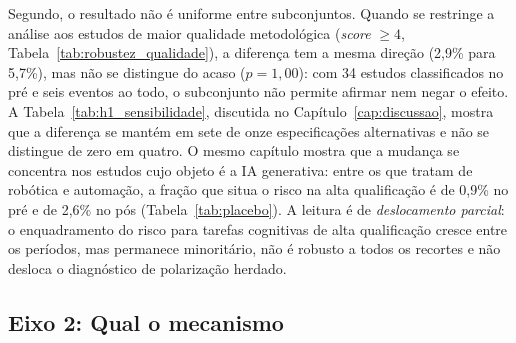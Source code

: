Segundo, o resultado não é uniforme entre subconjuntos. Quando se restringe a análise aos estudos de maior qualidade metodológica (\textit{score} $\geq 4$, Tabela~\ref{tab:robustez_qualidade}), a diferença tem a mesma direção (2,9\% para 5,7\%), mas não se distingue do acaso ($p = 1{,}00$): com 34 estudos classificados no pré e seis eventos ao todo, o subconjunto não permite afirmar nem negar o efeito. A Tabela~\ref{tab:h1_sensibilidade}, discutida no Capítulo~\ref{cap:discussao}, mostra que a diferença se mantém em sete de onze especificações alternativas e não se distingue de zero em quatro. O mesmo capítulo mostra que a mudança se concentra nos estudos cujo objeto é a IA generativa: entre os que tratam de robótica e automação, a fração que situa o risco na alta qualificação é de 0,9\% no pré e de 2,6\% no pós (Tabela~\ref{tab:placebo}). A leitura é de \emph{deslocamento parcial}: o enquadramento do risco para tarefas cognitivas de alta qualificação cresce entre os períodos, mas permanece minoritário, não é robusto a todos os recortes e não desloca o diagnóstico de polarização herdado.

\begin{table}[htbp]
\centering
\caption{Foco da hipótese: risco para alta qualificação, pré vs.\ pós-ChatGPT.}
\label{tab:polarizacao_prepos}

\end{table}

\begin{table}[htbp]
\centering
\caption{Robustez: risco para alta qualificação restrito a estudos de alta qualidade (score $\geq$ 4).}
\label{tab:robustez_qualidade}

\end{table}

\subsection{Eixo 2: Qual o mecanismo}


